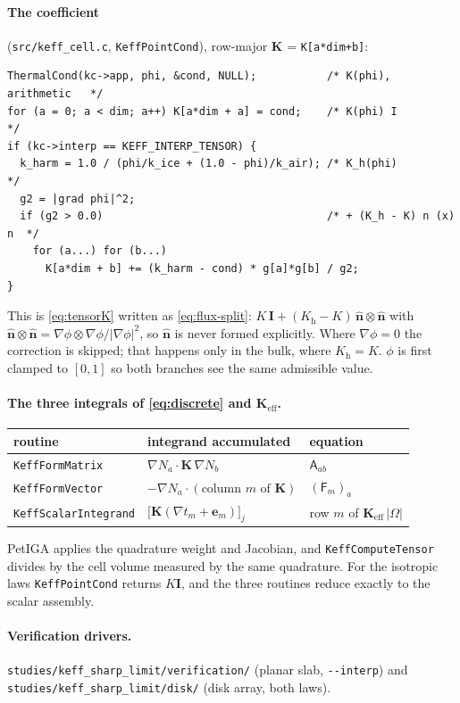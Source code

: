 \documentclass[11pt]{article}
\newcommand{\Om}{\Omega}
\newcommand{\bn}{\hat{\mathbf n}}
\newcommand{\bI}{\mathbf I}
\newcommand{\be}{\mathbf e}
\newcommand{\Keff}{\mathbf{K}_{\mathrm{eff}}}
\begin{document}
\paragraph{The coefficient} (\verb|src/keff_cell.c|, \verb|KeffPointCond|),
row-major $\mathbf K$ = \verb|K[a*dim+b]|:
\begin{lstlisting}
ThermalCond(kc->app, phi, &cond, NULL);           /* K(phi), arithmetic   */
for (a = 0; a < dim; a++) K[a*dim + a] = cond;    /* K(phi) I             */
if (kc->interp == KEFF_INTERP_TENSOR) {
  k_harm = 1.0 / (phi/k_ice + (1.0 - phi)/k_air); /* K_h(phi)             */
  g2 = |grad phi|^2;
  if (g2 > 0.0)                                   /* + (K_h - K) n (x) n  */
    for (a...) for (b...)
      K[a*dim + b] += (k_harm - cond) * g[a]*g[b] / g2;
}
\end{lstlisting}
This is \eqref{eq:tensorK} written as \eqref{eq:flux-split}:
$K\,\bI+(K_{\mathrm h}-K)\,\bn\otimes\bn$ with
$\bn\otimes\bn=\nabla\phi\otimes\nabla\phi/|\nabla\phi|^2$, so $\bn$ is
never formed explicitly. Where $\nabla\phi=0$ the correction is skipped;
that happens only in the bulk, where $K_{\mathrm h}=K$. $\phi$ is first
clamped to $[0,1]$ so both branches see the same admissible value.

\paragraph{The three integrals of \eqref{eq:discrete} and $\Keff$.}
\begin{center}
\begin{tabular}{@{}lll@{}}
\toprule
routine & integrand accumulated & equation\\
\midrule
\verb|KeffFormMatrix| & $\nabla N_a\cdot\mathbf K\,\nabla N_b$ & $\mathsf A_{ab}$\\
\verb|KeffFormVector| & $-\nabla N_a\cdot(\text{column }m\text{ of }\mathbf K)$ & $(\mathsf F_m)_a$\\
\verb|KeffScalarIntegrand| & $\big[\mathbf K(\nabla t_m+\be_m)\big]_j$ & row $m$ of $\Keff\,|\Om|$\\
\bottomrule
\end{tabular}
\end{center}
PetIGA applies the quadrature weight and Jacobian, and \verb|KeffComputeTensor|
divides by the cell volume measured by the same quadrature. For the isotropic
laws \verb|KeffPointCond| returns $K\bI$, and the three routines reduce exactly
to the scalar assembly.

\paragraph{Verification drivers.}
\verb|studies/keff_sharp_limit/verification/| (planar slab, \verb|--interp|) and
\verb|studies/keff_sharp_limit/disk/| (disk array, both laws).
\end{document}
